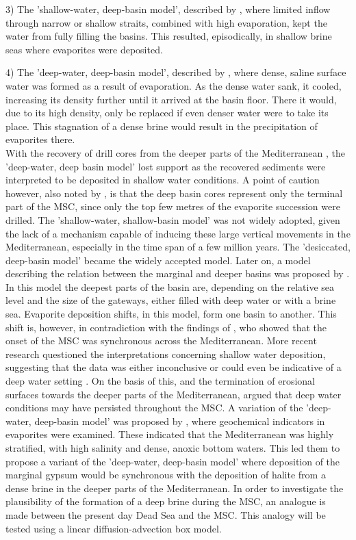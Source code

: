 \documentclass[twocolumn]{article}
\begin{document}
3) The 'shallow-water, deep-basin model', described by \cite{rouchy2006messinian}, where limited inflow through narrow or shallow straits, combined with high evaporation, kept the water from fully filling the basins. This resulted, episodically, in shallow brine seas where evaporites were deposited. 

4) The 'deep-water, deep-basin model', described by \cite{schmalz1969deep}, where dense, saline surface water was formed as a result of evaporation. As the dense water sank, it cooled, increasing its density further until it arrived at the basin floor. There it would, due to its high density, only be replaced if even denser water were to take its place. This stagnation of a dense brine would result in the precipitation of evaporites there.\\

With the recovery of drill cores from the deeper parts of the Mediterranean \citep{hsu1972origin}, the 'deep-water, deep basin model' lost support as the recovered sediments were interpreted to be deposited in shallow water conditions. A point of caution however, also noted by \cite{nesteroff1973mineralogy}, is that the deep basin cores represent only the terminal part of the MSC, since only the top few metres of the evaporite succession were drilled. The 'shallow-water, shallow-basin model' was not widely adopted, given the lack of a mechanism capable of inducing these large vertical movements in the Mediterranean, especially in the time span of a few million years. The 'desiccated, deep-basin model' became the widely accepted model. 
Later on, a model describing the relation between the marginal and deeper basins was proposed by \cite{rouchy2006messinian}. In this model the deepest parts of the basin are, depending on the relative sea level and the size of the gateways, either filled with deep water or with a brine sea. Evaporite deposition shifts, in this model, form one basin to another. This shift is, however, in contradiction with the findings of \cite{krijgsman2002onset}, who showed that the onset of the MSC was synchronous across the Mediterranean. 
More recent research questioned the interpretations concerning shallow water deposition, suggesting that the data was either inconclusive or could even be indicative of a deep water setting \citep{hardie2004did, roveri2001mediterranean}. On the basis of this, and the termination of erosional surfaces towards the deeper parts of the Mediterranean, \cite{roveri2014messinian} argued that deep water conditions may have persisted throughout the MSC. 
A variation of the 'deep-water, deep-basin model' was proposed by \cite{garcia2018geochemical}, where geochemical indicators in evaporites were examined. These indicated that the Mediterranean was highly stratified, with high salinity and dense, anoxic bottom waters. This led them to propose a variant of the 'deep-water, deep-basin model' where deposition of the marginal gypsum would be synchronous with the deposition of halite from a dense brine in the deeper parts of the Mediterranean. In order to investigate the plausibility of the formation of a deep brine during the MSC, an analogue is made between the present day Dead Sea and the MSC. This analogy will be tested using a linear diffusion-advection box model.
\end{document}
